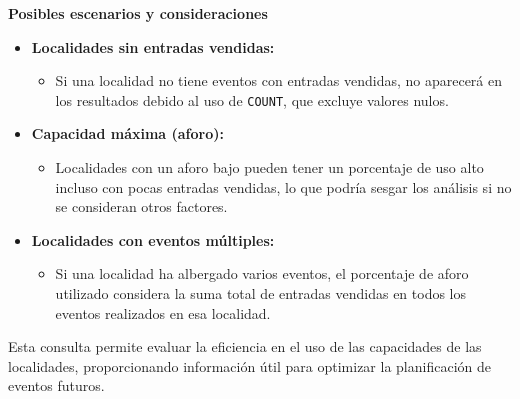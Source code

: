 \textbf{Posibles escenarios y consideraciones}

\begin{itemize} \item \textbf{Localidades sin entradas vendidas:} \begin{itemize} \item Si una localidad no tiene eventos con entradas vendidas, no aparecerá en los resultados debido al uso de \texttt{COUNT}, que excluye valores nulos. \end{itemize}
	
	\item \textbf{Capacidad máxima (aforo):} \begin{itemize} \item Localidades con un aforo bajo pueden tener un porcentaje de uso alto incluso con pocas entradas vendidas, lo que podría sesgar los análisis si no se consideran otros factores. \end{itemize}
	
	\item \textbf{Localidades con eventos múltiples:} \begin{itemize} \item Si una localidad ha albergado varios eventos, el porcentaje de aforo utilizado considera la suma total de entradas vendidas en todos los eventos realizados en esa localidad. \end{itemize} \end{itemize}

Esta consulta permite evaluar la eficiencia en el uso de las capacidades de las localidades, proporcionando información útil para optimizar la planificación de eventos futuros.